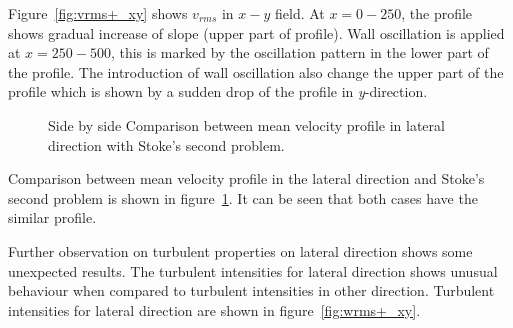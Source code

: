 Figure~\ref{fig:vrms+_xy} shows $v_{rms}$ in $x-y$ field. At $x=0-250$, the profile shows gradual increase of slope (upper part of profile). Wall oscillation is applied at $x=250-500$, this is marked by the oscillation pattern in the lower part of the profile. The introduction of wall oscillation also change the upper part of the profile which is shown by a sudden drop of the profile in \emph{y}-direction.

\begin{figure}[!h]
  \centering
  \caption{Side by side Comparison between mean velocity profile in lateral direction with Stoke's second problem.}
  \label{fig:stokes}
\end{figure}

Comparison between mean velocity profile in the lateral direction and Stoke's second problem is shown in figure~\ref{fig:stokes}. It can be seen that both cases have the similar profile.

Further observation on turbulent properties on lateral direction shows some unexpected results. The turbulent intensities for lateral direction shows unusual behaviour when compared to turbulent intensities in other direction. Turbulent intensities for lateral direction are shown in figure~\ref{fig:wrms+_xy}.

